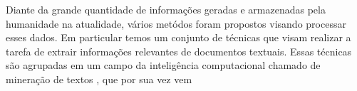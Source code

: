Diante da grande quantidade de informações geradas e armazenadas pela humanidade na atualidade, 
vários metódos foram propostos visando processar esses dados. Em particular temos um conjunto de 
técnicas que visam realizar a tarefa de extrair informações relevantes de documentos textuais. 
Essas técnicas são agrupadas em um campo da inteligência computacional chamado de mineração de textos
, que por sua vez vem 
